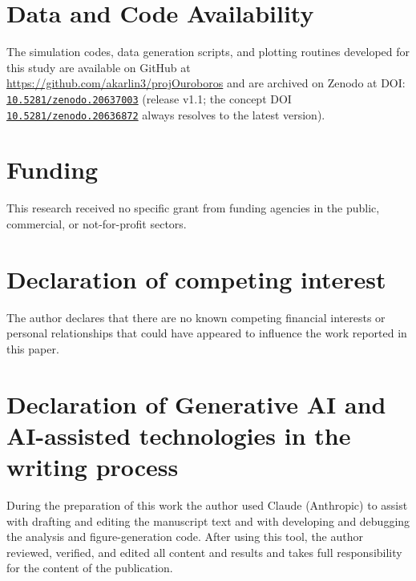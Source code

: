 \documentclass[review,3p,times]{elsarticle}
\newcommand{\zenododoi}{10.5281/zenodo.20636872}
\newcommand{\zenododoiversion}{10.5281/zenodo.20637003}
\begin{document}
\section*{Data and Code Availability}
The simulation codes, data generation scripts, and plotting routines developed for this study are available on GitHub at \url{https://github.com/akarlin3/projOuroboros} and are archived on Zenodo at DOI: \href{https://doi.org/\zenododoiversion}{\texttt{\zenododoiversion}} (release v1.1; the concept DOI \href{https://doi.org/\zenododoi}{\texttt{\zenododoi}} always resolves to the latest version).

\section*{Funding}
This research received no specific grant from funding agencies in the public, commercial, or not-for-profit sectors.

\section*{Declaration of competing interest}
The author declares that there are no known competing financial interests or personal relationships that could have appeared to influence the work reported in this paper.

\section*{Declaration of Generative AI and AI-assisted technologies in the writing process}
During the preparation of this work the author used Claude (Anthropic) to assist with drafting and editing the manuscript text and with developing and debugging the analysis and figure-generation code. After using this tool, the author reviewed, verified, and edited all content and results and takes full responsibility for the content of the publication.



\end{document}
